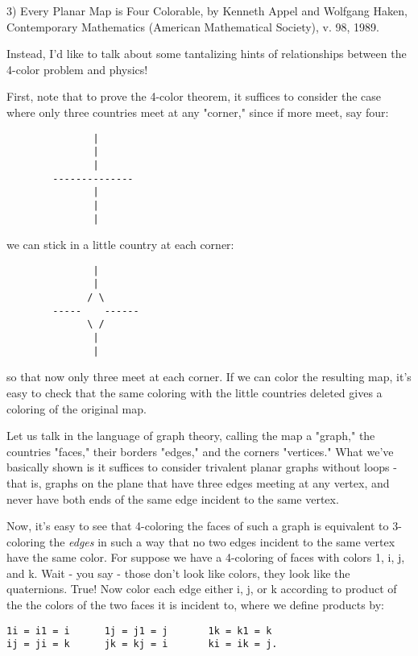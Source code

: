 3)  Every Planar Map is Four Colorable, by Kenneth Appel and Wolfgang
Haken, Contemporary Mathematics (American Mathematical Society), v. 98,
1989.  

Instead, I'd like to talk about some tantalizing hints of relationships
between the 4-color problem and physics!  

First, note that to prove the 4-color theorem, it suffices to consider
the case where only three countries meet at any "corner," since if more
meet, say four:

\begin{verbatim}
               |
               |
               |
        --------------
               |
               |
               |
\end{verbatim}
    

we can stick in a little country at each corner:


\begin{verbatim}
               |
               |
              / \
        -----    ------
              \ /
               |
               |
\end{verbatim}
    

so that now only three meet at each corner.  If we can color the
resulting map, it's easy to check that the same coloring with the little
countries deleted gives a coloring of the original map.

Let us talk in the language of graph theory, calling the map a "graph,"
the countries "faces," their borders "edges," and the corners
"vertices."  What we've basically shown is it suffices to consider
trivalent planar graphs without loops - that is, graphs on the plane
that have three edges meeting at any vertex, and never have both ends of
the same edge incident to the same vertex. 

Now, it's easy to see that 4-coloring the faces of such a graph is equivalent
to 3-coloring the \emph{edges} in such a way that no two edges incident to
the same vertex have the same color.   For suppose we have a 4-coloring
of faces with colors 1, i, j, and k.  Wait - you say - those don't look
like colors, they look like the quaternions.  True!   Now color each
edge either i, j, or k according to product of the the colors of the two
faces it is incident to, where we define products by:

\begin{verbatim}
1i = i1 = i      1j = j1 = j       1k = k1 = k
ij = ji = k      jk = kj = i       ki = ik = j.
\end{verbatim}
    

